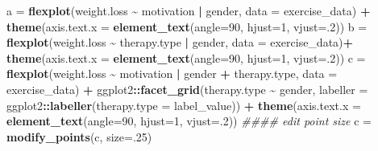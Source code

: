 \documentclass[
  english,
  man]{apa6}
\newenvironment{Shaded}{\begin{snugshade}}{\end{snugshade}}
\newcommand{\CommentTok}[1]{\textcolor[rgb]{0.56,0.35,0.01}{\textit{#1}}}
\newcommand{\DataTypeTok}[1]{\textcolor[rgb]{0.13,0.29,0.53}{#1}}
\newcommand{\DecValTok}[1]{\textcolor[rgb]{0.00,0.00,0.81}{#1}}
\newcommand{\KeywordTok}[1]{\textcolor[rgb]{0.13,0.29,0.53}{\textbf{#1}}}
\newcommand{\NormalTok}[1]{#1}
\newcommand{\OperatorTok}[1]{\textcolor[rgb]{0.81,0.36,0.00}{\textbf{#1}}}
\newcommand{\StringTok}[1]{\textcolor[rgb]{0.31,0.60,0.02}{#1}}
\begin{document}
\small

\begin{Shaded}
\begin{Highlighting}[]
\NormalTok{a =}\StringTok{ }\KeywordTok{flexplot}\NormalTok{(weight.loss }\OperatorTok{\textasciitilde{}}\StringTok{ }\NormalTok{motivation }\OperatorTok{|}\StringTok{ }\NormalTok{gender, }
             \DataTypeTok{data =}\NormalTok{ exercise\_data) }\OperatorTok{+}
\StringTok{              }\KeywordTok{theme}\NormalTok{(}\DataTypeTok{axis.text.x =} \KeywordTok{element\_text}\NormalTok{(}\DataTypeTok{angle=}\DecValTok{90}\NormalTok{, }\DataTypeTok{hjust=}\DecValTok{1}\NormalTok{, }\DataTypeTok{vjust=}\NormalTok{.}\DecValTok{2}\NormalTok{))}
\NormalTok{b =}\StringTok{ }\KeywordTok{flexplot}\NormalTok{(weight.loss }\OperatorTok{\textasciitilde{}}\StringTok{ }\NormalTok{therapy.type }\OperatorTok{|}\StringTok{ }\NormalTok{gender, }
             \DataTypeTok{data =}\NormalTok{ exercise\_data)}\OperatorTok{+}
\StringTok{              }\KeywordTok{theme}\NormalTok{(}\DataTypeTok{axis.text.x =} \KeywordTok{element\_text}\NormalTok{(}\DataTypeTok{angle=}\DecValTok{90}\NormalTok{, }\DataTypeTok{hjust=}\DecValTok{1}\NormalTok{, }\DataTypeTok{vjust=}\NormalTok{.}\DecValTok{2}\NormalTok{))}
\NormalTok{c =}\StringTok{ }\KeywordTok{flexplot}\NormalTok{(weight.loss }\OperatorTok{\textasciitilde{}}\StringTok{ }\NormalTok{motivation }\OperatorTok{|}\StringTok{  }\NormalTok{gender }\OperatorTok{+}\StringTok{ }\NormalTok{therapy.type, }
             \DataTypeTok{data =}\NormalTok{ exercise\_data) }\OperatorTok{+}
\StringTok{      }\NormalTok{ggplot2}\OperatorTok{::}\KeywordTok{facet\_grid}\NormalTok{(therapy.type }\OperatorTok{\textasciitilde{}}\StringTok{ }\NormalTok{gender, }
              \DataTypeTok{labeller =}\NormalTok{ ggplot2}\OperatorTok{::}\KeywordTok{labeller}\NormalTok{(}\DataTypeTok{therapy.type =}\NormalTok{ label\_value)) }\OperatorTok{+}
\StringTok{              }\KeywordTok{theme}\NormalTok{(}\DataTypeTok{axis.text.x =} \KeywordTok{element\_text}\NormalTok{(}\DataTypeTok{angle=}\DecValTok{90}\NormalTok{, }\DataTypeTok{hjust=}\DecValTok{1}\NormalTok{, }\DataTypeTok{vjust=}\NormalTok{.}\DecValTok{2}\NormalTok{))}
\CommentTok{\#\#\#\# edit point size}
\NormalTok{c =}\StringTok{ }\KeywordTok{modify\_points}\NormalTok{(c, }\DataTypeTok{size=}\NormalTok{.}\DecValTok{25}\NormalTok{)}
\end{Highlighting}
\end{Shaded}

\normalsize

\small
\end{document}
